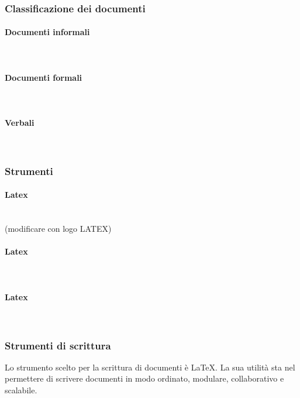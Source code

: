 		\subsubsection{Classificazione dei documenti}
		\paragraph{Documenti informali} \mbox{}\\
		\paragraph{Documenti formali} \mbox{}\\
		\paragraph{Verbali} \mbox{}\\
		\subsubsection{Strumenti}
		\paragraph{Latex} \mbox{}\\ (modificare con logo LATEX)
		\paragraph{Latex} \mbox{}\\
		\paragraph{Latex} \mbox{}\\
				
		\subsubsection{Strumenti di scrittura}
		Lo strumento scelto per la scrittura di documenti è \LaTeX. La sua utilità sta nel permettere di scrivere documenti in modo ordinato, modulare, collaborativo e scalabile.
